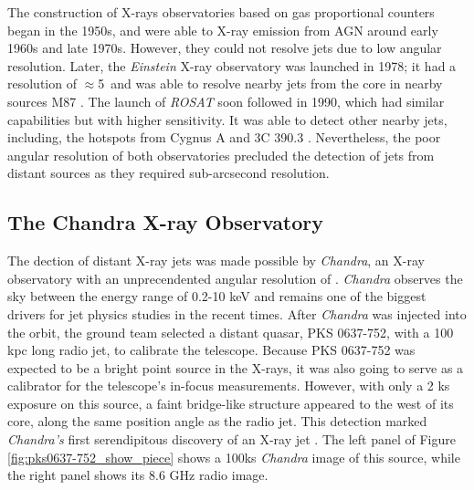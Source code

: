 The construction of X-rays observatories based on gas proportional counters began in the 1950s, and were able to X-ray emission from AGN around early 1960s and late 1970s.  However, they could not resolve jets due to low angular resolution. Later, the \textit{Einstein} X-ray observatory was launched in 1978; it had a resolution of $\approx$5\as~and was able to resolve nearby jets from the core in nearby sources M87 \citep[][]{schreier1982high}. The launch of \textit{ROSAT} soon followed in 1990, which had similar capabilities but with higher sensitivity. It was able to detect other nearby jets, including, the hotspots from Cygnus A and 3C 390.3 \citep{reynolds1996rosat,almudena1997extended}. Nevertheless, the poor angular resolution of both  observatories precluded the detection of jets from distant sources as they required sub-arcsecond resolution.

\subsection{The Chandra X-ray Observatory}
The dection of distant X-ray jets was made possible by \textit{Chandra}, an X-ray observatory with an unprecendented angular resolution of \as. \textit{Chandra} observes the sky between the energy range of 0.2-10 keV and remains one of the biggest drivers for jet physics studies in the recent times. After \textit{Chandra} was injected into the orbit, the ground team selected a distant quasar, PKS 0637-752, with a 100 kpc long radio jet, to calibrate the telescope. Because PKS 0637-752 was expected to be a bright point source in the X-rays, it was also going to serve as a calibrator for the telescope's in-focus measurements. However, with only a 2 ks exposure on this source, a faint bridge-like structure appeared to the west of its core, along the same position angle as the radio jet. This detection marked \textit{Chandra's} first serendipitous discovery of an X-ray jet \citep{chartas2000chandra}. The left panel of Figure \ref{fig:pks0637-752_show_piece} shows a 100ks \textit{Chandra} image of this source, while the right panel shows its 8.6 GHz radio image.

